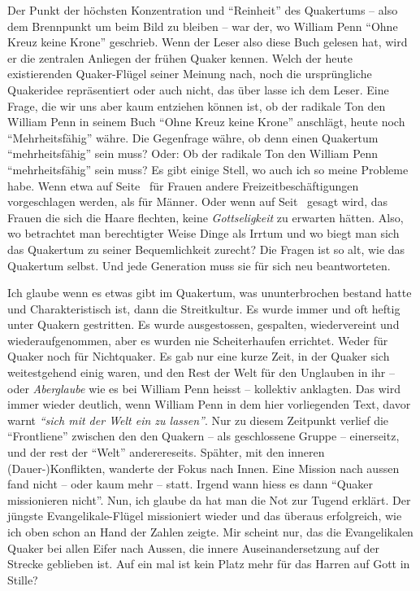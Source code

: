 \begin{center}

\end{center}

\medskip

Der Punkt der höchsten Konzentration und "`Reinheit"' des Quakertums -- also dem
Brennpunkt um beim Bild zu bleiben -- war der, wo William Penn "`Ohne Kreuz
keine Krone"' geschrieb. Wenn der Leser also diese Buch gelesen hat, wird er die
zentralen
Anliegen der frühen Quaker kennen. Welch der heute existierenden Quaker-Flügel
seiner Meinung nach, noch die ursprüngliche Quakeridee repräsentiert oder auch
nicht, das über lasse ich dem Leser. Eine Frage, die wir uns aber kaum entziehen
können ist, ob der radikale Ton den William Penn in seinem Buch "`Ohne Kreuz
keine Krone"' anschlägt, heute noch "`Mehrheitsfähig"' währe. Die Gegenfrage
währe,
ob denn einen Quakertum "`mehrheitsfähig"' sein muss? Oder: Ob der radikale Ton
den William Penn "`mehrheitsfähig"' sein muss?
Es gibt einige Stell, wo auch
ich so meine Probleme habe. Wenn etwa auf Seite~\pageref{kap15_ab5} für
Frauen andere Freizeitbeschäftigungen vorgeschlagen werden, als für Männer. Oder
wenn auf Seit~\pageref{ref:haarflechten} gesagt wird, das Frauen die sich die
Haare flechten, keine \textit{Gottseligkeit} zu erwarten hätten. Also, wo
betrachtet man berechtigter Weise Dinge als Irrtum und wo biegt man sich das
Quakertum zu seiner Bequemlichkeit zurecht? Die Fragen ist so alt, wie das
Quakertum selbst. Und jede Generation muss sie für sich neu beantworteten.

\medskip

Ich glaube wenn es etwas gibt im Quakertum, was ununterbrochen bestand hatte und
Charakteristisch ist, dann die Streitkultur. Es wurde immer und oft heftig unter
Quakern gestritten. Es wurde ausgestossen, gespalten, wiedervereint und
wiederaufgenommen, aber es wurden nie Scheiterhaufen errichtet. Weder für Quaker
noch für Nichtquaker. Es gab nur eine kurze Zeit, in der Quaker sich
weitestgehend
einig waren, und den Rest der Welt für den Unglauben in ihr -- oder
\textit{Aberglaube} wie es bei William Penn heisst -- kollektiv anklagten. Das
wird immer wieder deutlich, wenn William Penn in dem hier vorliegenden Text,
davor warnt \textit{"`sich mit
der Welt ein zu lassen"'}. Nur zu diesem Zeitpunkt verlief die "`Frontliene"'
zwischen den den Quakern -- als geschlossene Gruppe -- einerseitz, und der rest
der "`Welt"' anderereseits. Spähter, mit den inneren (Dauer-)Konflikten,
wanderte der Fokus
nach Innen. Eine Mission nach aussen fand nicht -- oder kaum mehr -- statt.
Irgend wann hiess es dann "`Quaker missionieren nicht"'. Nun, ich glaube da hat
man die Not zur Tugend erklärt. Der jüngste Evangelikale-Flügel missioniert
wieder und das überaus erfolgreich, wie ich oben schon an Hand der Zahlen
zeigte. Mir scheint nur,
das die Evangelikalen Quaker bei allen Eifer nach Aussen, die innere
Auseinandersetzung auf der Strecke geblieben ist. Auf ein mal ist kein Platz
mehr für das Harren auf Gott in Stille?

